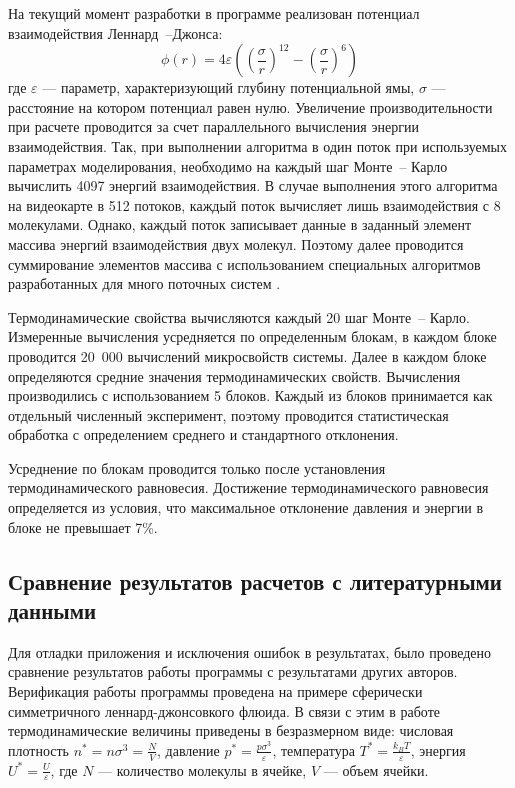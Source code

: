 На текущий момент разработки в программе реализован потенциал взаимодействия Леннард~--Джонса:
\begin{equation}
	\phi(r) = 4 \varepsilon \left( \left( \dfrac{\sigma}{r} \right) ^{12} - \left( \dfrac{\sigma}{r} \right) ^6 \right)
\end{equation}
где $\varepsilon$ --- параметр, характеризующий глубину потенциальной ямы, $\sigma$ --- расстояние на котором потенциал равен нулю.  Увеличение производительности при расчете проводится за счет параллельного вычисления энергии взаимодействия. Так, при выполнении алгоритма в один поток при используемых параметрах моделирования, необходимо на каждый шаг Монте~-- Карло вычислить 4097 энергий взаимодействия. В случае выполнения этого алгоритма на видеокарте в 512 потоков, каждый поток вычисляет лишь взаимодействия с 8 молекулами. Однако, каждый поток записывает данные в заданный элемент массива энергий взаимодействия двух молекул. Поэтому далее проводится суммирование элементов массива с использованием специальных алгоритмов разработанных для много поточных систем \cite{cuda_book}.

Термодинамические свойства вычисляются каждый 20 шаг Монте~-- Карло. Измеренные вычисления усредняется по определенным блокам, в каждом блоке проводится 20~000 вычислений микросвойств системы. Далее в каждом блоке определяются средние значения термодинамических свойств. Вычисления производились с использованием 5 блоков. Каждый из блоков принимается как отдельный численный эксперимент, поэтому проводится статистическая обработка с определением среднего и стандартного отклонения.

Усреднение по блокам проводится только после установления термодинамического равновесия. Достижение термодинамического равновесия определяется  из условия, что максимальное отклонение давления и энергии в блоке не превышает 7\%. 

\subsection{Сравнение результатов расчетов с литературными данными}
Для отладки приложения и исключения ошибок в результатах, было проведено сравнение результатов работы программы с результатами других авторов. Верификация работы программы проведена на примере сферически симметричного леннард-джонсовкого флюида. 
В связи с этим в работе термодинамические величины приведены в безразмерном виде: числовая плотность $n^* = n \sigma ^3 = \frac{N}{V}$, давление $p^* = \frac{p \sigma^3}{\varepsilon}$, температура $T^* = \frac{k_B T}{\varepsilon}$, энергия $U^* = \frac{U}{\varepsilon}$, где $N$ --- количество молекулы в ячейке, $V$ --- объем ячейки.


